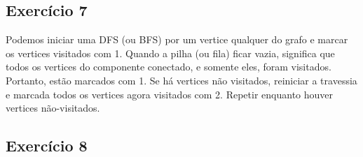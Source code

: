 \subsection{Exercício 7}\label{sec:exer7}
Podemos iniciar uma DFS (ou BFS) por um vertice qualquer do grafo e marcar os vertices
visitados com 1. Quando a pilha (ou fila) ficar vazia, significa que todos os vertices
do componente conectado, e somente eles, foram visitados. Portanto, estão marcados com 1.
Se há vertices não visitados, reiniciar a travessia e marcada todos os vertices agora
visitados com 2. Repetir enquanto houver vertices não-visitados.

\subsection{Exercício 8}\label{sec:exer8}
